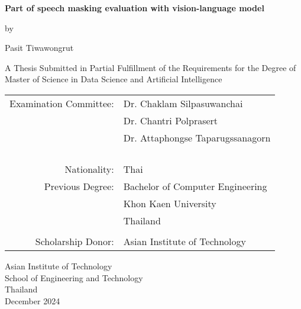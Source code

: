 \begin{titlepage}
  \begin{center}
   
  \textbf{\large{ Part of speech masking evaluation with vision-language model }}

  \vspace{3em} %
  
  by
  
  \vspace{3em} %
  
  Pasit Tiwawongrut
  
  \vspace{4em} %

  A Thesis Submitted in Partial Fulfillment of the Requirements for the Degree of Master of Science in Data Science and Artificial Intelligence

  \vspace{4em} %

\begin{center}
  \begin{tabular}{ rl }
Examination Committee: & Dr. Chaklam Silpasuwanchai \\
                       & Dr. Chantri Polprasert \\
                       & Dr. Attaphongse Taparugssanagorn \\\\
                       
\\ \\ \\
Nationality:     & Thai \\
Previous Degree: & Bachelor of Computer Engineering \\
                 & Khon Kaen University \\
                 & Thailand \\
\\
Scholarship Donor: & Asian Institute of Technology
  \end{tabular}
\end{center}

\vspace{3em}

Asian Institute of Technology \\
School of Engineering and Technology \\
Thailand \\           
December 2024


  \end{center}
\end{titlepage}
